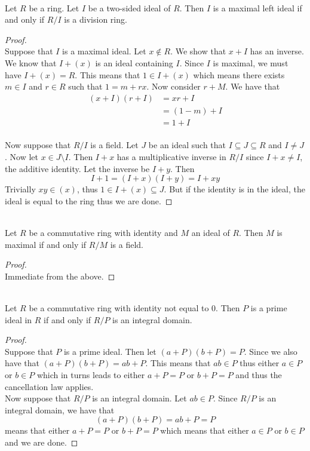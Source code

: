 \documentclass[a4paper]{article}
\begin{document}
\begin{prp}{}{}\\
Let $R$ be a ring. Let $I$ be a two-sided ideal of $R$. Then $I$ is a maximal left ideal if and only if $R/I$ is a division ring. 
\begin{proof}\\
Suppose that $I$ is a maximal ideal. Let $x\notin R$. We show that $x+I$ has an inverse. We know that $I+(x)$ is an ideal containing $I$. Since $I$ is maximal, we must have $I+(x)=R$. This means that $1\in I+(x)$ which means there exists $m\in I$ and $r\in R$ such that $1=m+rx$. Now consider $r+M$. We have that 
\begin{align*}
(x+I)(r+I)&=xr+I\\
&=(1-m)+I\\
&=1+I
\end{align*}~\\
Now suppose that $R/I$ is a field. Let $J$ be an ideal such that $I\subseteq J\subseteq R$ and $I\neq J$. Now let $x\in J\setminus I$. Then $I+x$ has a multiplicative inverse in $R/I$ since $I+x\neq I$, the additive identity. Let the inverse be $I+y$. Then $$I+1=(I+x)(I+y)=I+xy$$ Trivially $xy\in(x)$, thus $1\in I+(x)\subseteq J$. But if the identity is in the ideal, the ideal is equal to the ring thus we are done. 
\end{proof}
\end{prp}

\begin{crl}{}{}\\
Let $R$ be a commutative ring with identity and $M$ an ideal of $R$. Then $M$ is maximal if and only if $R/M$ is a field. 
\begin{proof}\\
Immediate from the above. 
\end{proof}
\end{crl}

\begin{prp}{}{}\\
Let $R$ be a commutative ring with identity not equal to $0$. Then $P$ is a prime ideal in $R$ if and only if $R/P$ is an integral domain. 
\begin{proof}\\
Suppose that $P$ is a prime ideal. Then let $(a+P)(b+P)=P$. Since we also have that $(a+P)(b+P)=ab+P$. This means that $ab\in P$ thus either $a\in P$ or $b\in P$ which in turns leads to either $a+P=P$ or $b+P=P$ and thus the cancellation law applies. \\
Now suppose that $R/P$ is an integral domain. Let $ab\in P$. Since $R/P$ is an integral domain, we have that $$(a+P)(b+P)=ab+P=P$$ means that either $a+P=P$ or $b+P=P$ which means that either $a\in P$ or $b\in P$ and we are done. 
\end{proof}
\end{prp}
\end{document}
